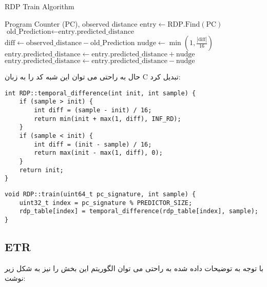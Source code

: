 \documentclass[17pt]{article}
\begin{document}
\begin{latin}
\begin{algorithm}
\caption{RDP Train Algorithm}\label{alg:rdp_train}
\begin{algorithmic}[1]
\Require Program Counter (PC), observed distance
\Statex
{}
    \State $\text{entry} \gets \text{RDP.Find}(\text{PC})$
    \State $\text{old\_Prediction} \gets \text{entry.predicted\_distance}$
    \State $\text{diff} \gets \text{observed\_distance} - \text{old\_Prediction}$
    \State $\text{nudge} \gets \min\left(1, \frac{|\text{diff}|}{16}\right)$
    \Statex
        \State $\text{entry.predicted\_distance} \gets \text{entry.predicted\_distance} + \text{nudge}$
    \Else
        \State $\text{entry.predicted\_distance} \gets \text{entry.predicted\_distance} - \text{nudge}$
    \EndIf
\EndFunction
\end{algorithmic}
\end{algorithm}
\end{latin}

حال به راحتی می توان این شبه کد را به زبان C تبدیل کرد:
\begin{LTR}
\begin{lstlisting}
int RDP::temporal_difference(int init, int sample) {
    if (sample > init) {
        int diff = (sample - init) / 16;
        return min(init + max(1, diff), INF_RD);
    }
    if (sample < init) {
        int diff = (init - sample) / 16;
        return max(init - max(1, diff), 0);
    }
    return init;
}
\end{lstlisting}
\end{LTR}

\begin{LTR}
\begin{lstlisting}
void RDP::train(uint64_t pc_signature, int sample) {
    uint32_t index = pc_signature % PREDICTOR_SIZE;
    rdp_table[index] = temporal_difference(rdp_table[index], sample);
}
\end{lstlisting}
\end{LTR}

\subsection{ETR}
با توجه به توضیحات داده شده به راحتی می توان الگوریتم این بخش را نیز به شکل زیر نوشت:
\end{document}
